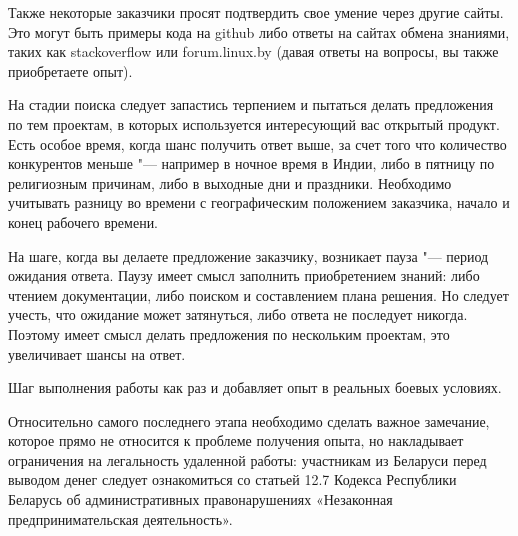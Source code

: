 \documentclass[10pt, a5paper]{article}
\begin{document}
Также некоторые заказчики просят подтвердить свое умение через другие сайты. Это могут быть примеры кода на github либо ответы на сайтах обмена знаниями, таких как stackoverflow или forum.linux.by (давая ответы на вопросы, вы также приобретаете опыт).

На стадии поиска следует запастись терпением и пытаться делать предложения по тем проектам, в которых используется интересующий вас открытый продукт. Есть особое время, когда шанс получить ответ выше, за счет того что количество конкурентов меньше "--- например в ночное время в Индии, либо в пятницу по религиозным причинам, либо в выходные дни и праздники. Необходимо учитывать разницу во времени с географическим положением заказчика, начало и конец рабочего времени.

На шаге, когда вы делаете предложение заказчику, возникает пауза "--- период ожидания ответа. Паузу имеет смысл заполнить приобретением знаний: либо чтением документации, либо поиском и составлением плана решения. Но следует учесть, что ожидание может затянуться, либо ответа не последует никогда. Поэтому имеет смысл делать предложения по нескольким проектам, это увеличивает шансы на ответ.

Шаг выполнения работы как раз и добавляет опыт в реальных боевых условиях.

Относительно самого последнего этапа необходимо сделать важное замечание, которое прямо не относится к проблеме получения опыта, но накладывает ограничения на легальность удаленной работы: участникам из Беларуси перед выводом денег следует ознакомиться со статьей 12.7 Кодекса Республики Беларусь об административных правонарушениях «Незаконная предпринимательская деятельность».
\end{document}
